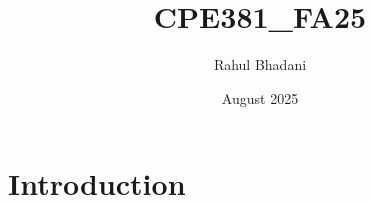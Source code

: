 \documentclass{article}
\title{CPE381\_FA25}
\author{Rahul Bhadani}
\date{August 2025}
\begin{document}
\maketitle

\section{Introduction}
\end{document}
